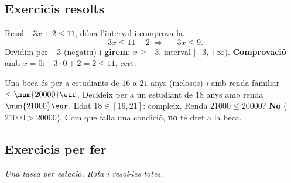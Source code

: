 \subsection{Exercicis resolts}

\begin{exresolt}
Resol $-3x+2\le 11$, dóna l'interval i comprova-la.
\solucio
\[
-3x\le 11-2 \;\Rightarrow\; -3x\le 9.
\]
Dividim per $-3$ (negatiu) i \textbf{girem}: $x\ge -3$, interval $[-3,+\infty)$.
\textbf{Comprovació} amb $x=0$: $-3\cdot 0+2=2\le 11$, cert.
\resposta{$x\ge -3$, interval $[-3,+\infty)$.}
\end{exresolt}

\begin{exresolt}
Una beca és per a estudiants de $16$ a $21$ anys (inclosos) \emph{i} amb renda
familiar $\le\num{20000}\eur$. Decideix per a un estudiant de $18$ anys amb renda
$\num{21000}\eur$.
\solucio
Edat $18\in[16,21]$: compleix. Renda $\num{21000}\le\num{20000}$? \textbf{No}
($\num{21000}>\num{20000}$). Com que falla una condició, \textbf{no} té dret a la beca.
\end{exresolt}

\subsection{Exercicis per fer}

\noindent\textit{Una tasca per estació. Rota i resol-les totes.}

